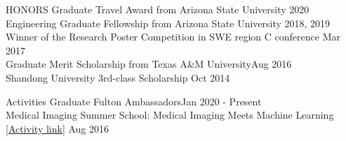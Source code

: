 \documentclass{resume} %
\begin{document}
\vspace{-0.1cm}
\begin{rSection}{HONORS} \itemsep -3pt  
Graduate Travel Award from Arizona State University \hfill 2020\\ 
Engineering Graduate Fellowship from Arizona State University \hfill 2018, 2019\\ 
Winner of the Research Poster Competition in SWE region C conference \hfill Mar 2017\\ 
Graduate Merit Scholarship from Texas A\&M University\hfill Aug 2016\\ 
Shandong University 3rd-class Scholarship \hfill Oct 2014
\end{rSection}  
\vspace{-0.1cm}
\begin{rSection}{Activities} 
Graduate Fulton Ambassadors\hfill  Jan 2020 - Present\\ 
Medical Imaging Summer School:  Medical Imaging Meets Machine Learning\href{https://iplab.dmi.unict.it/miss16/}{ [Activity link]} \hfill Aug 2016 
\end{rSection}  
\end{document}
